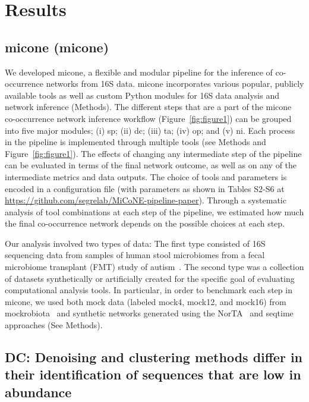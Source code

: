 
\section*{Results}

  \subsection*{\acl{micone} (\acs{micone})}

  We developed \ac{micone}, a flexible and modular pipeline for the inference of co-occurrence networks from 16S data.
  \ac{micone} incorporates various popular, publicly available tools as well as custom Python modules for 16S data analysis and network inference (Methods).
  The different steps that are a part of the \ac{micone} co-occurrence network inference workflow (Figure~\ref{fig:figure1}) can be grouped into five major modules; (i) \ac{sp}; (ii) \ac{dc}; (iii) \ac{ta}; (iv) \ac{op}; and (v) \ac{ni}.
  Each process in the pipeline is implemented through multiple tools (see Methods and Figure~\ref{fig:figure1}).
  The effects of changing any intermediate step of the pipeline can be evaluated in terms of the final network outcome, as well as on any of the intermediate metrics and data outputs.
  The choice of tools and parameters is encoded in a configuration file (with parameters as shown in Tables S2-S6 at \href{https://github.com/segrelab/MiCoNE-pipeline-paper}{https://github.com/segrelab/MiCoNE-pipeline-paper}).
  Through a systematic analysis of tool combinations at each step of the pipeline, we estimated how much the final co-occurrence network depends on the possible choices at each step.

  Our analysis involved two types of data: The first type consisted of 16S sequencing data from samples of human stool microbiomes from a fecal microbiome transplant (FMT) study of autism~\cite{Kang2017}.
  The second type was a collection of datasets synthetically or artificially created for the specific goal of evaluating computational analysis tools.
  In particular, in order to benchmark each step in \ac{micone}, we used both mock data (labeled mock4, mock12, and mock16) from mockrobiota~\cite{Bokulich2016} and synthetic networks generated using the NorTA~\cite{Kurtz2015} and seqtime~\cite{Rottjers2018} approaches (See Methods).

  \FloatBarrier

  \subsection*{DC: Denoising and clustering methods differ in their identification of sequences that are low in abundance}

